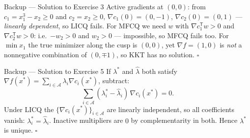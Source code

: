 \documentclass[aspectratio=169,10pt]{beamer}
\newcommand{\Aset}{\mathcal{A}}
\newcommand{\grad}{\nabla}
\newcommand{\T}{^{\mathsf{T}}}
\newcommand{\xs}{x^{*}}
\newcommand{\ls}{\lambda^{*}}
\begin{document}
\begin{frame}{Backup — Solution to Exercise 3}
  Active gradients at $(0,0)$: from $c_1=x_1^3-x_2\ge0$ and $c_2=x_2\ge0$, $\grad c_1(0)=(0,-1)$,
  $\grad c_2(0)=(0,1)$ — \emph{linearly dependent}, so LICQ fails. For MFCQ we need $w$ with
  $\grad c_1\T w>0$ and $\grad c_2\T w>0$: i.e.\ $-w_2>0$ and $w_2>0$ — impossible, so MFCQ fails too.
  For $\min x_1$ the true minimizer along the cusp is $(0,0)$, yet
  $\grad f=(1,0)$ is \emph{not} a nonnegative combination of $(0,\mp1)$, so KKT has no solution. \hfill$\square$
\end{frame}

\begin{frame}{Backup — Solution to Exercise 5}
  If $\ls$ and $\hat\lambda$ both satisfy $\grad f(\xs)=\sum_{i\in\Aset}\lambda_i\grad c_i(\xs)$, subtract:
  \[ \sum_{i\in\Aset}(\lambda_i^{*}-\hat\lambda_i)\,\grad c_i(\xs)=0. \]
  Under LICQ the $\{\grad c_i(\xs)\}_{i\in\Aset}$ are linearly independent, so all coefficients vanish:
  $\lambda_i^{*}=\hat\lambda_i$. Inactive multipliers are $0$ by complementarity in both. Hence $\ls$ is unique. \hfill$\square$
\end{frame}
\end{document}
